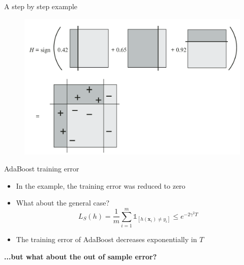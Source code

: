 \begin{frame}{A step by step example}
    \begin{figure}
        \includegraphics[width=\textwidth]{img/example_result}
    \end{figure}
\end{frame}

\begin{frame}{AdaBoost training error}
    \begin{itemize} \pause
        \item In the example, the training error was reduced to zero \pause
        \item What about the general case? \pause
        \begin{equation*}
            L_S(h) = \frac{1}{m} \sum_{i=1}^m \mathds{1}_{\left[ h(\mathbf{x}_i) \neq y_i \right]} \leq e^{-2 \gamma^2 T}
        \end{equation*} \pause
        \item The training error of AdaBoost decreases exponentially in $T$ \pause
    \end{itemize}
    \textbf{...but what about the out of sample error?}
\end{frame}